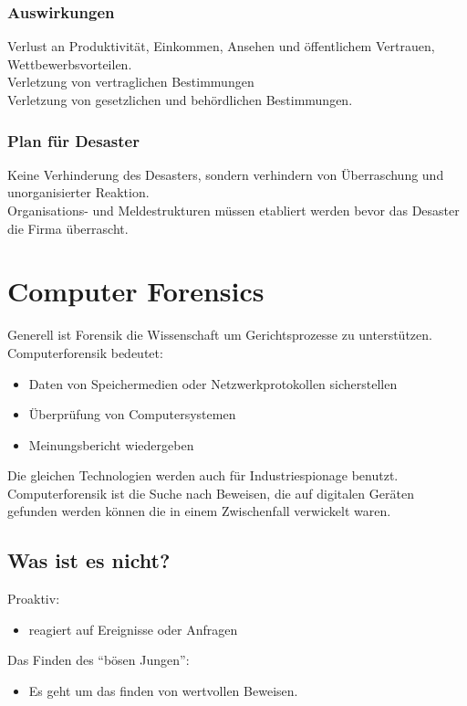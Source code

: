 \documentclass{article} %
\begin{document}
\subsubsection{Auswirkungen}
Verlust an Produktivität, Einkommen, Ansehen und öffentlichem Vertrauen, Wettbewerbsvorteilen.\\
Verletzung von vertraglichen Bestimmungen\\
Verletzung von gesetzlichen und behördlichen Bestimmungen.\\
\subsubsection{Plan für Desaster}
Keine Verhinderung des Desasters, sondern verhindern von Überraschung und unorganisierter Reaktion.\\
Organisations- und Meldestrukturen müssen etabliert werden bevor das Desaster die Firma überrascht.

\section{Computer Forensics}
Generell ist Forensik die Wissenschaft um Gerichtsprozesse zu unterstützen.\\
Computerforensik bedeutet:
\begin{itemize}
	\item Daten von Speichermedien oder Netzwerkprotokollen sicherstellen
    \item Überprüfung von Computersystemen
    \item Meinungsbericht wiedergeben
\end{itemize}

Die gleichen Technologien werden auch für Industriespionage benutzt.\\
Computerforensik ist die Suche nach Beweisen, die auf digitalen Geräten gefunden werden können die in einem Zwischenfall verwickelt waren.\\
\subsection{Was ist es nicht?}
Proaktiv:
\begin{itemize}
	\item reagiert auf Ereignisse oder Anfragen
\end{itemize}
Das Finden des "`bösen Jungen"':
\begin{itemize}
	\item Es geht um das finden von wertvollen Beweisen.
\end{itemize}
\end{document}
